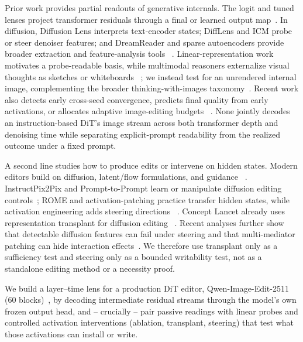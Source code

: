 \documentclass[letterpaper]{article} %
\newcommand{\model}{Qwen-Image-Edit-2511}
\begin{document}
Prior work provides partial readouts of generative internals. The logit and
tuned lenses project transformer residuals through a final or learned output
map~\citep{nostalgebraist2020logitlens,belrose2023tuned}. In diffusion,
Diffusion Lens interprets text-encoder states; DiffLens and ICM probe or steer
denoiser features; and DreamReader and sparse autoencoders provide broader
extraction and feature-analysis tools
~\citep{toker2024diffusionlens,shi2025difflens,zaleska2026icm,prakash2026dreamreader,surkov2025sae}.
Linear-representation work motivates a probe-readable basis, while multimodal
reasoners externalize visual thoughts as sketches or whiteboards
~\citep{park2024linear,hu2024sketchpad,menon2024whiteboard,wu2024vot,li2025mvot};
we instead test for an unrendered internal image, complementing the broader
thinking-with-images taxonomy~\citep{su2025thinkingsurvey}.
Recent work also detects early cross-seed convergence, predicts final quality
from early activations, or allocates adaptive image-editing budgets
~\citep{kwon2026lockin,guo2026probeselect,qu2026adecot}. None jointly decodes
an instruction-based DiT's image stream across both transformer depth and
denoising time while separating explicit-prompt readability from the realized
outcome under a fixed prompt.

A second line studies how to produce edits or intervene on hidden states.
Modern editors build on diffusion, latent/flow formulations, and guidance
~\citep{ho2020ddpm,song2021ddim,rombach2022ldm,lipman2023flowmatching,liu2023rectifiedflow,ho2022cfg}.
InstructPix2Pix and Prompt-to-Prompt learn or manipulate diffusion editing
controls~\citep{brooks2023instructpix2pix,hertz2023prompttoprompt}; ROME and
activation-patching practice transfer hidden states, while activation
engineering adds steering directions
~\citep{meng2022rome,heimersheim2024activation,turner2023actadd}. Concept
Lancet already uses representation transplant for diffusion editing
~\citep{luo2025colan}. Recent analyses further show that detectable diffusion
features can fail under steering and that multi-mediator patching can hide
interaction effects~\citep{cassano2026look,vaidyanathan2026curse}. We therefore
use transplant only as a sufficiency test and steering only as a bounded
writability test, not as a standalone editing method or a necessity proof.

We build a layer--time lens for a production DiT editor,
\model{} (60 blocks)~\citep{peebles2023dit,qwen2025image}, by decoding intermediate residual streams through
the model's own frozen output head, and -- crucially -- pair passive
readings with linear probes and controlled activation
interventions (ablation, transplant, steering) that test what those
activations can install or write.
\end{document}

